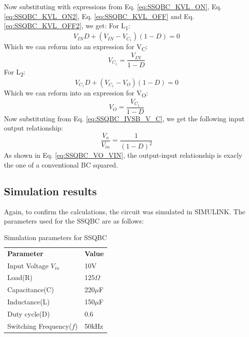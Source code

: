 Now substituting with expressions from Eq. \ref{eq:SSQBC_KVL_ON}, Eq. \ref{eq:SSQBC_KVL_ON2}, Eq. \ref{eq:SSQBC_KVL_OFF} and  Eq. \ref{eq:SSQBC_KVL_OFF2}, we get:
For L\textsubscript{1}:
\begin{equation}
	V_{IN}D+(V_{IN}-V_{C_1})(1-D)=0
	\label{eq:SSQBC_IVSB_L1}
\end{equation}
Which we can reform into an expression for V\textsubscript{C}:
\begin{equation}
	V_{C_1}=\frac{V_{IN}}{1-D}
	\label{eq:SSQBC_IVSB_V_C}
\end{equation}
For L\textsubscript{2}:
\begin{equation}
	V_{C_1}D+(V_{C_1}-V_{O})(1-D)=0
	\label{eq:SSQBC_IVSB_L2}
\end{equation}
Which we can reform into an expression for V\textsubscript{O}:
\begin{equation}
	V_{O}=\frac{V_{C_1}}{1-D}
	\label{eq:SSQBC_IVSB_V_O}
\end{equation}
Now substituting from Eq. \ref{eq:SSQBC_IVSB_V_C}, we get the following input output relationship:
\begin{equation}
	\frac{V_o}{V_{in}} = \frac{1}{(1-D)^2}
	\label{eq:SSQBC_VO_VIN}
\end{equation}
As shown in Eq. \ref{eq:SSQBC_VO_VIN}, the output-input relationship is exacly the one of a conventional BC squared. 

\subsection{Simulation results}

Again, to confirm the calculations, the circuit was simulated in SIMULINK. The parameters used for the SSQBC are as follows:

\begin{table}[H]
\begin{center}
\caption {Simulation parameters for SSQBC} \label{tab:SSQBC} 
\begin{tabular}{|l|l|}
\cline{1-2}
\textbf{Parameter} & \textbf{Value}  \\ \cline{1-2}
Input Voltage $V_{in}$          &      10V   \\ \cline{1-2}
Load(R)   & 125$\Omega$           \\ \cline{1-2}
Capacitance(C)          &       220$\mu$F     \\ \cline{1-2}
Inductance(L)          &      150$\mu$F      \\ \cline{1-2}
Duty cycle(D)          &     0.6       \\ \cline{1-2}
Switching Frequency($f$)          &      50kHz      \\ \cline{1-2}
\end{tabular}
\end{center}
\end{table}

